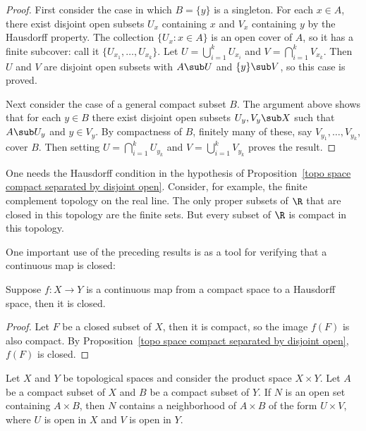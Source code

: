 \begin{proof}
First consider the case in which $B=\{y\}$ is a singleton. For each $x\in A$, there exist disjoint open subsets $U_x$ containing $x$ and $V_x$ containing $y$ by the Hausdorff property. The collection $\{U_x:x\in A\}$ is an open cover of $A$, so it has a finite subcover: call it $\{U_{x_1},\dots,U_{x_k}\}$. Let $U=\bigcup_{i=1}^{k}U_{x_i}$ and $V=\bigcap_{i=1}^{k}V_{x_k}$. Then $U$ and $V$ are disjoint open subsets with $A\sub U$ and $\{y\}\sub V$, so this case is proved.\par
Next consider the case of a general compact subset $B$. The argument above shows that for each $y\in B$ there exist disjoint open subsets $U_y,V_y\sub X$ such that $A\sub U_y$ and $y\in V_y$. By compactness of $B$, finitely many of these, say $V_{y_1},\dots,V_{y_k}$, cover $B$. Then setting $U=\bigcap_{i=1}^{k}U_{y_k}$ and $V=\bigcup_{i=1}^{k}V_{y_k}$ proves the result.
\end{proof}
\begin{example}
One needs the Hausdorff condition in the hypothesis of Proposition~\ref{topo space compact separated by disjoint open}. Consider, for example, the finite complement topology on the real line. The only proper subsets of $\R$ that are closed in this topology are the finite sets. But every subset of $\R$ is compact in this topology.
\end{example}
One important use of the preceding results is as a tool for verifying that a continuous map is closed:
\begin{theorem}
Suppose $f:X\to Y$ is a continuous map from a compact space to a Hausdorff space, then it is closed.
\end{theorem}
\begin{proof}
Let $F$ be a closed subset of $X$, then it is compact, so the image $f(F)$ is also compact. By Proposition~\ref{topo space compact separated by disjoint open}, $f(F)$ is closed.
\end{proof}
\begin{lemma}
Let $X$ and $Y$ be topological spaces and consider the product space $X\times Y$. Let $A$ be a compact subset of $X$ and $B$ be a compact subset of $Y$. If $N$ is an open set containing $A\times B$, then $N$ contains a neighborhood of $A\times B$ of the form $U\times V$, where $U$ is open in $X$ and $V$ is open in $Y$.
\end{lemma}
